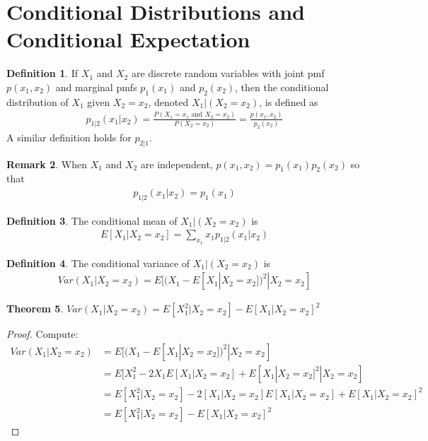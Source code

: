 \documentclass[11pt]{amsart}
\newtheorem{theorem}{Theorem}[section]
\theoremstyle{definition}
\newtheorem{definition}[theorem]{Definition}
\newtheorem{remark}[theorem]{Remark}
\numberwithin{equation}{section}
\begin{document}
\section{Conditional Distributions and Conditional Expectation}
\begin{definition}
    If $X_1$ and $X_2$ are discrete random variables with joint pmf $p(x_1,x_2)$ and marginal pmfs $p_1(x_1)$ and $p_2(x_2)$, then the conditional distribution of $X_1$ given $X_2=x_2$, denoted $X_1|(X_2=x_2)$, is defined as
    \begin{align*}
        p_{1|2}(x_1|x_2)=\frac{P(X_1=x_1\text{ and }X_2=x_2)}{P(X_2=x_2)}=\frac{p(x_1,x_2)}{p_2(x_2)}
    \end{align*}
    A similar definition holds for $p_{2|1}$.
\end{definition}
\begin{remark}
    When $X_1$ and $X_2$ are independent, $p(x_1,x_2)=p_1(x_1)p_2(x_2)$ so that 
    \begin{align*}
        p_{1|2}(x_1|x_2)=p_1(x_1)
    \end{align*}
\end{remark}
\begin{definition}
    The conditional mean of $X_1|(X_2=x_2)$ is 
    \begin{align*}
        E[X_1|X_2=x_2]=\sum_{x_1}x_1p_{1|2}(x_1|x_2)
    \end{align*}
\end{definition}
\begin{definition}
    The conditional variance of $X_1|(X_2=x_2)$ is
    \begin{align*}
        Var(X_1|X_2=x_2)=E[(X_1-E[X_1|X_2=x_2])^2|X_2=x_2]
    \end{align*}
\end{definition}
\begin{theorem}
    $\displaystyle Var(X_1|X_2=x_2)=E[X_1^2|X_2=x_2]-E[X_1|X_2=x_2]^2$
\end{theorem}
\begin{proof}
    Compute:
    \begin{align*}
        Var(X_1|X_2=x_2)&=E[(X_1-E[X_1|X_2=x_2])^2|X_2=x_2]\\
        &=E[X_1^2-2X_1E[X_1|X_2=x_2]+E[X_1|X_2=x_2]^2|X_2=x_2]\\
        &=E[X_1^2|X_2=x_2]-2[X_1|X_2=x_2]E[X_1|X_2=x_2]+E[X_1|X_2=x_2]^2\\
        &=E[X_1^2|X_2=x_2]-E[X_1|X_2=x_2]^2
    \end{align*}
\end{proof}
\end{document}
